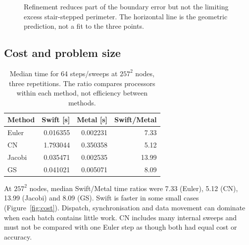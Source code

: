 \documentclass[11pt,a4paper]{article}
\begin{document}
\begin{figure}[tbp]\centering{}
\caption{Refinement reduces part of the boundary error but not the limiting excess stair-stepped perimeter. The horizontal line is the geometric prediction, not a fit to the three points.}\label{fig:robin}\end{figure}

\subsection{Cost and problem size}
\begin{table}[tbp]\centering\small
\caption{Median time for 64 steps/sweeps at $257^2$ nodes, three repetitions. The ratio compares processors within each method, not efficiency between methods.}\label{tab:timing}
\begin{tabular}{@{}lrrr@{}}\toprule
Method & Swift [s] & Metal [s] & Swift/Metal\\\midrule
Euler & 0.016355 & 0.002231 & 7.33\\
CN & 1.793044 & 0.350358 & 5.12\\
Jacobi & 0.035471 & 0.002535 & 13.99\\
GS & 0.041021 & 0.005071 & 8.09\\
\bottomrule\end{tabular}\end{table}

At $257^2$ nodes, median Swift/Metal time ratios were 7.33 (Euler), 5.12 (CN), 13.99 (Jacobi) and 8.09 (GS). Swift is faster in some small cases (Figure~\ref{fig:cost}). Dispatch, synchronisation and data movement can dominate when each batch contains little work. CN includes many internal sweeps and must not be compared with one Euler step as though both had equal cost or accuracy.
\end{document}
